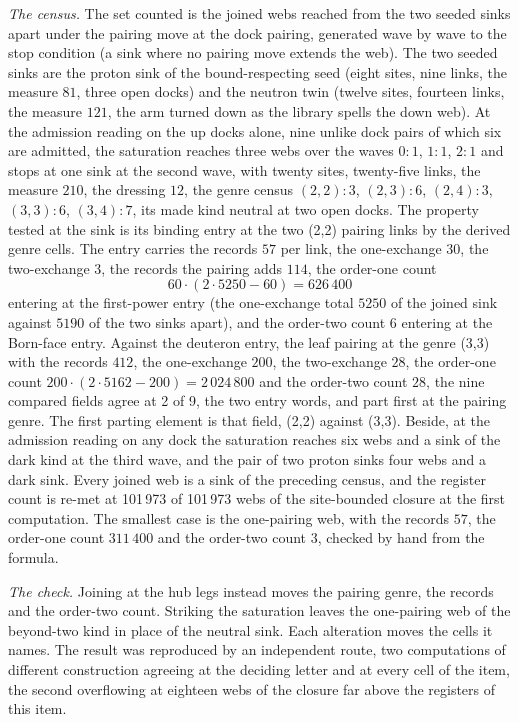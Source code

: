 \begin{chproof}
\textit{The census.} The set counted is the joined webs reached from the two seeded sinks apart under the pairing move at the dock pairing, generated wave by wave to the stop condition (a sink where no pairing move extends the web). The two seeded sinks are the proton sink of the bound-respecting seed (eight sites, nine links, the measure $81$, three open docks) and the neutron twin (twelve sites, fourteen links, the measure $121$, the arm turned down as the library spells the down web). At the admission reading on the up docks alone, nine unlike dock pairs of which six are admitted, the saturation reaches three webs over the waves $0{:}1$, $1{:}1$, $2{:}1$ and stops at one sink at the second wave, with twenty sites, twenty-five links, the measure $210$, the dressing $12$, the genre census $(2,2){:}3$, $(2,3){:}6$, $(2,4){:}3$, $(3,3){:}6$, $(3,4){:}7$, its made kind neutral at two open docks. The property tested at the sink is its binding entry at the two (2,2) pairing links by the derived genre cells. The entry carries the records $57$ per link, the one-exchange $30$, the two-exchange $3$, the records the pairing adds $114$, the order-one count
\begin{equation}
60\cdot(2\cdot 5250-60)=626\,400
\end{equation}
entering at the first-power entry (the one-exchange total $5250$ of the joined sink against $5190$ of the two sinks apart), and the order-two count $6$ entering at the Born-face entry. Against the deuteron entry, the leaf pairing at the genre (3,3) with the records $412$, the one-exchange $200$, the two-exchange $28$, the order-one count $200\cdot(2\cdot 5162-200)=2\,024\,800$ and the order-two count $28$, the nine compared fields agree at 2 of 9, the two entry words, and part first at the pairing genre. The first parting element is that field, (2,2) against (3,3). Beside, at the admission reading on any dock the saturation reaches six webs and a sink of the dark kind at the third wave, and the pair of two proton sinks four webs and a dark sink. Every joined web is a sink of the preceding census, and the register count is re-met at 101\,973 of 101\,973 webs of the site-bounded closure at the first computation. The smallest case is the one-pairing web, with the records $57$, the order-one count $311\,400$ and the order-two count $3$, checked by hand from the formula.

\textit{The check.} Joining at the hub legs instead moves the pairing genre, the records and the order-two count. Striking the saturation leaves the one-pairing web of the beyond-two kind in place of the neutral sink. Each alteration moves the cells it names. The result was reproduced by an independent route, two computations of different construction agreeing at the deciding letter and at every cell of the item, the second overflowing at eighteen webs of the closure far above the registers of this item.
\end{chproof}
\par\medskip{}\label{narr:close:9-7}\par
